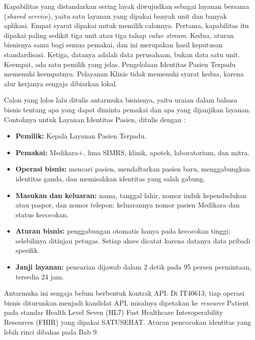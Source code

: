 \begin{pendalaman}[title={Pendalaman Teknis (opsional): Dari Kapabilitas ke Layanan Bersama},
                   parbox=false]
  Kapabilitas yang distandarkan sering layak diwujudkan sebagai layanan bersama
  (\textit{shared service}), yaitu satu layanan yang dipakai banyak unit dan banyak aplikasi.
  Empat syarat dipakai untuk memilih calonnya. Pertama, kapabilitas itu dipakai paling
  sedikit tiga unit atau tiga tahap \textit{value stream}. Kedua, aturan bisnisnya sama bagi
  semua pemakai, dan ini merupakan hasil keputusan standardisasi. Ketiga, datanya adalah
  data perusahaan, bukan data satu unit. Keempat, ada satu pemilik yang jelas. Pengelolaan
  Identitas Pasien Terpadu memenuhi keempatnya. Pelayanan Klinis tidak memenuhi syarat
  kedua, karena alur kerjanya sengaja dibiarkan lokal.

  Calon yang lolos lalu ditulis antarmuka bisnisnya, yaitu uraian dalam bahasa bisnis
  tentang apa yang dapat diminta pemakai dan apa yang dijanjikan layanan. Contohnya untuk
  Layanan Identitas Pasien, ditulis dengan
  :

  \begin{itemize}
    \item \textbf{Pemilik:} Kepala Layanan Pasien Terpadu.
    \item \textbf{Pemakai:} Medikara+, lima SIMRS, klinik, apotek, laboratorium, dan mitra.
    \item \textbf{Operasi bisnis:} mencari pasien, mendaftarkan pasien baru, menggabungkan
          identitas ganda, dan memisahkan identitas yang salah gabung.
    \item \textbf{Masukan dan keluaran:} nama, tanggal lahir, nomor induk kependudukan atau
          paspor, dan nomor telepon; keluarannya nomor pasien Medikara dan status kecocokan.
    \item \textbf{Aturan bisnis:} penggabungan otomatis hanya pada kecocokan tinggi;
          selebihnya ditinjau petugas. Setiap akses dicatat karena datanya data pribadi
          spesifik.
    \item \textbf{Janji layanan:} pencarian dijawab dalam 2 detik pada 95 persen permintaan,
          tersedia 24 jam.
  \end{itemize}

  Antarmuka ini sengaja belum berbentuk kontrak API. Di IT40613, tiap operasi bisnis
  diturunkan menjadi kandidat API, misalnya dipetakan ke \textit{resource} Patient pada
  standar Health Level Seven (HL7) Fast Healthcare Interoperability Resources (FHIR) yang
  dipakai SATUSEHAT. Aturan pencocokan identitas yang lebih rinci dibahas pada Bab 9.
\end{pendalaman}

